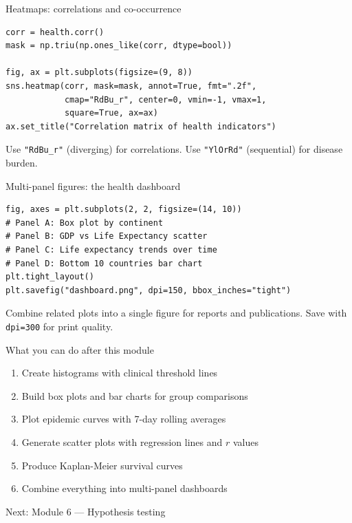 \documentclass[aspectratio=169,11pt]{beamer}
\begin{document}
\begin{frame}[fragile]{Heatmaps: correlations and co-occurrence}
\begin{verbatim}
corr = health.corr()
mask = np.triu(np.ones_like(corr, dtype=bool))

fig, ax = plt.subplots(figsize=(9, 8))
sns.heatmap(corr, mask=mask, annot=True, fmt=".2f",
            cmap="RdBu_r", center=0, vmin=-1, vmax=1,
            square=True, ax=ax)
ax.set_title("Correlation matrix of health indicators")
\end{verbatim}

\vspace{4pt}
Use \texttt{"RdBu\_r"} (diverging) for correlations. Use \texttt{"YlOrRd"} (sequential) for disease burden.
\end{frame}

\begin{frame}[fragile]{Multi-panel figures: the health dashboard}
\begin{verbatim}
fig, axes = plt.subplots(2, 2, figsize=(14, 10))
# Panel A: Box plot by continent
# Panel B: GDP vs Life Expectancy scatter
# Panel C: Life expectancy trends over time
# Panel D: Bottom 10 countries bar chart
plt.tight_layout()
plt.savefig("dashboard.png", dpi=150, bbox_inches="tight")
\end{verbatim}

\vspace{4pt}
Combine related plots into a single figure for reports and publications. Save with \texttt{dpi=300} for print quality.
\end{frame}

\begin{frame}{What you can do after this module}
\begin{enumerate}
  \item Create histograms with clinical threshold lines
  \item Build box plots and bar charts for group comparisons
  \item Plot epidemic curves with 7-day rolling averages
  \item Generate scatter plots with regression lines and $r$ values
  \item Produce Kaplan-Meier survival curves
  \item Combine everything into multi-panel dashboards
\end{enumerate}

\vspace{12pt}
\centering
\Large \alert{Next: Module 6 --- Hypothesis testing}
\end{frame}
\end{document}
